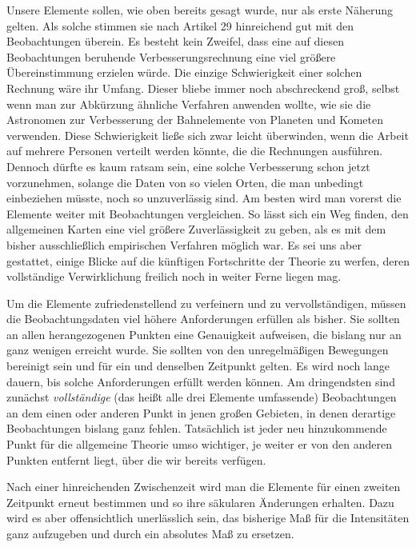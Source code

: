 Unsere Elemente sollen, wie oben bereits gesagt wurde, nur als erste Näherung gelten. Als solche stimmen sie nach Artikel 29 hinreichend gut mit den Beobachtungen überein. Es besteht kein Zweifel, dass eine auf diesen Beobachtungen beruhende Verbesserungsrechnung eine viel größere Übereinstimmung erzielen würde. Die einzige Schwierigkeit einer solchen Rechnung wäre ihr Umfang. Dieser bliebe immer noch abschreckend groß, selbst wenn man zur Abkürzung ähnliche Verfahren anwenden wollte, wie sie die Astronomen zur Verbesserung der Bahnelemente von Planeten und Kometen verwenden. Diese Schwierigkeit ließe sich zwar leicht
überwinden, wenn die Arbeit auf mehrere Personen verteilt werden könnte, die die Rechnungen ausführen. Dennoch dürfte es kaum ratsam sein, eine solche Verbesserung schon jetzt vorzunehmen, solange die Daten von so vielen Orten, die man unbedingt einbeziehen müsste, noch so unzuverlässig sind. Am besten wird man vorerst die Elemente weiter mit Beobachtungen vergleichen. So lässt sich ein Weg finden, den allgemeinen Karten eine viel größere Zuverlässigkeit zu geben, als es mit dem bisher ausschließlich empirischen Verfahren möglich war. Es sei uns aber gestattet, einige Blicke auf die künftigen Fortschritte der Theorie zu werfen, deren vollständige Verwirklichung freilich noch in weiter Ferne liegen mag.

Um die Elemente zufriedenstellend zu verfeinern und zu vervollständigen, müssen die Beobachtungsdaten viel höhere Anforderungen erfüllen als bisher. Sie sollten an allen herangezogenen Punkten eine Genauigkeit aufweisen, die bislang nur an ganz wenigen erreicht wurde. Sie sollten von den unregelmäßigen Bewegungen bereinigt sein und für ein und denselben Zeitpunkt gelten. Es wird noch lange dauern, bis solche Anforderungen erfüllt werden können. Am dringendsten sind zunächst \textit{vollständige} (das heißt alle drei Elemente umfassende) Beobachtungen an dem einen oder anderen Punkt in jenen großen Gebieten, in denen derartige Beobachtungen bislang ganz fehlen. Tatsächlich ist jeder neu hinzukommende Punkt für die allgemeine Theorie umso wichtiger, je weiter er von den anderen Punkten entfernt liegt, über die wir bereits verfügen.

Nach einer hinreichenden Zwischenzeit wird man die Elemente für einen zweiten Zeitpunkt erneut bestimmen und so ihre säkularen Änderungen erhalten. Dazu wird es aber offensichtlich unerlässlich sein, das bisherige Maß für die Intensitäten ganz aufzugeben und durch ein absolutes Maß zu ersetzen.

